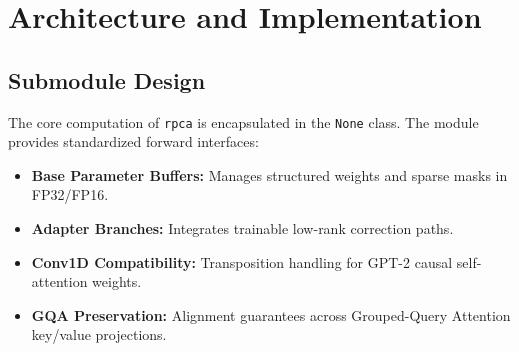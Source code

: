\section{Architecture and Implementation}

\subsection{Submodule Design}
The core computation of \texttt{rpca} is encapsulated in the \texttt{None} class. The module provides standardized forward interfaces:
\begin{itemize}
\item \textbf{Base Parameter Buffers:} Manages structured weights and sparse masks in FP32/FP16.
\item \textbf{Adapter Branches:} Integrates trainable low-rank correction paths.
\item \textbf{Conv1D Compatibility:} Transposition handling for GPT-2 causal self-attention weights.
\item \textbf{GQA Preservation:} Alignment guarantees across Grouped-Query Attention key/value projections.
\end{itemize}
